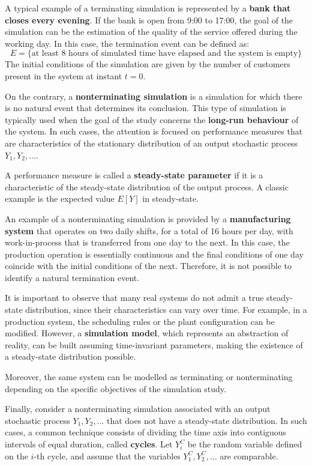 A typical example of a terminating simulation is represented by a \textbf{bank that closes every evening}. If the bank is open from 9:00 to 17:00, the goal of the simulation can be the estimation of the quality of the service offered during the working day. In this case, the termination event can be defined as:
\[
E = \{\text{at least 8 hours of simulated time have elapsed and the system is empty}\}
\]
The initial conditions of the simulation are given by the number of customers present in the system at instant $t = 0$.

On the contrary, a \textbf{nonterminating simulation} is a simulation for which there is no natural event that determines its conclusion. This type of simulation is typically used when the goal of the study concerns the \textbf{long-run behaviour} of the system. In such cases, the attention is focused on performance measures that are characteristics of the stationary distribution of an output stochastic process $Y_1, Y_2, \dots$.

A performance measure is called a \textbf{steady-state parameter} if it is a characteristic of the steady-state distribution of the output process. A classic example is the expected value $E[Y]$ in steady-state.

An example of a nonterminating simulation is provided by a \textbf{manufacturing system} that operates on two daily shifts, for a total of 16 hours per day, with work-in-process that is transferred from one day to the next. In this case, the production operation is essentially continuous and the final conditions of one day coincide with the initial conditions of the next. Therefore, it is not possible to identify a natural termination event.

It is important to observe that many real systems do not admit a true steady-state distribution, since their characteristics can vary over time. For example, in a production system, the scheduling rules or the plant configuration can be modified. However, a \textbf{simulation model}, which represents an abstraction of reality, can be built assuming time-invariant parameters, making the existence of a steady-state distribution possible.

Moreover, the same system can be modelled as terminating or nonterminating depending on the specific objectives of the simulation study.

Finally, consider a nonterminating simulation associated with an output stochastic process $Y_1, Y_2, \dots$ that does not have a steady-state distribution. In such cases, a common technique consists of dividing the time axis into contiguous intervals of equal duration, called \textbf{cycles}. Let $Y_i^C$ be the random variable defined on the $i$-th cycle, and assume that the variables $Y_1^C, Y_2^C, \dots$ are comparable.

